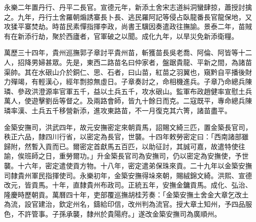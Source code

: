 \begin{pinyinscope}
永樂二年置丹行、丹平二長官。宣德元年，新添土舍宋志道糾洞蠻肆掠，蕭授討擒之。九年，丹行土舍羅朝煽誘寨長卜長、逃民羅阿記等侵占臥龍番長官龍保地，又攻猱平寨焚劫。時苗民素憚指揮李政，尚書王驥因奏遣政往撫諭。景泰二年，苗賊有在新添行劫，聚於西廬者，官軍破之以聞。成化九年，以旱災免新添衛糧。

萬歷三十四年，貴州巡撫郭子章討平貴州苗，斬獲苗長吳老喬、阿倫、阿皆等十二人，招降男婦甚眾。先是，東西二路苗名曰仲家者，盤踞貴龍、平新之間，為諸苗渠帥。其在水硍山介於銅仁、思、石者，曰山苗，紅苗之羽翼也，窺黔自平播後財力殫竭，有輕漢心，經年剽掠無虛日。子章奏討之，命相機進兵。子章乃命總兵陳璘、參政洪澄源率官軍五千，益以土兵五千，攻水硍山。監軍布政趙健率宣慰土兵萬人，使遊擊劉岳等督之。及兩路會師，皆九十餘日而克。二寇既平，專命總兵陳璘率漢、土兵五千移營新添，進攻東路苗，不一月復克其六箐，諸苗盡平。

金築安撫司，洪武四年，故元安撫密定來朝貢馬，詔賜文綺三匹，置金築長官司，秩正六品，隸四川行省，以密定為長官，世襲。十四年敕勞密定曰：「西南諸部雖歸附，然暫入貢而已。爾密定首獻馬五百匹，以助征討，其誠可嘉，故遣特使往諭，俟班師之日，重勞爾功。」升金築長官司為安撫司，仍以密定為安撫使，予世襲。十六年，密定遣使貢方物。十八年，密定遣弟保珠來貢。二十九年以金築安撫司隸貴州軍民指揮使司。永樂初年，金築安撫得垛來朝，賜絨錦文綺。洪熙、宣德改元，皆貢馬。十年，直隸貴州布政司。正統五年，安撫金鏞貢馬。成化、弘治、隆慶時歷朝貢。萬曆四十年，吏部覆巡撫胡桂芳奏：「金築安撫土舍金大章乞改土為流，設官建治，欽定州名，鑄給印信，改州判為流官。授大章土知州，予四品服色，不許管事。子孫承襲，隸州於貴陽府。」遂改金築安撫司為廣順州。


\end{pinyinscope}